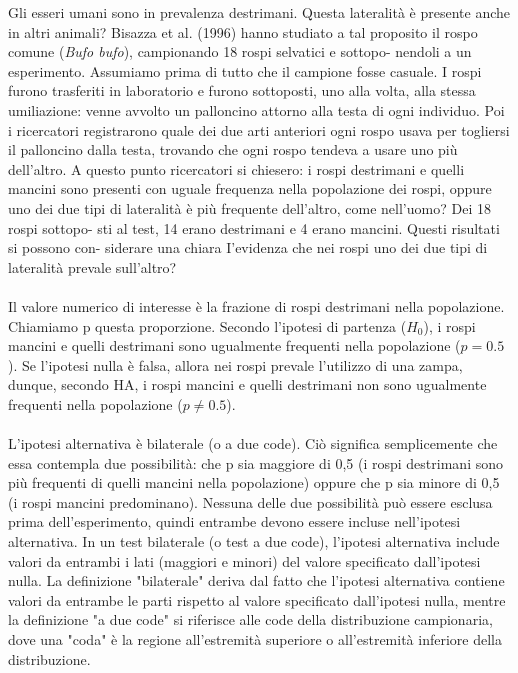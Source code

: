 \documentclass[drafts, 10pt]{book}
\newcounter{example}[section]
\begin{document}
\begin{example}\label{eslateralita}
    Gli esseri umani sono in prevalenza destrimani. Questa lateralità è presente anche in altri animali? Bisazza et al. (1996) hanno studiato a tal proposito il rospo comune (\textit{Bufo bufo}), campionando 18 rospi selvatici e sottopo- nendoli a un esperimento. Assumiamo prima di tutto che il campione fosse casuale. I rospi furono trasferiti in laboratorio e furono sottoposti, uno alla volta, alla stessa umiliazione: venne avvolto un palloncino attorno alla testa di ogni individuo. Poi i ricercatori registrarono quale dei due arti anteriori ogni rospo usava per togliersi il palloncino dalla testa, trovando che ogni rospo tendeva a usare uno più dell'altro. A questo punto ricercatori si chiesero: i rospi destrimani e quelli mancini sono presenti con uguale frequenza nella popolazione dei rospi, oppure uno dei due tipi di lateralità è più frequente dell'altro, come nell'uomo? Dei 18 rospi sottopo- sti al test, 14 erano destrimani e 4 erano mancini. Questi risultati si possono con- siderare una chiara I'evidenza che nei rospi uno dei due tipi di lateralità prevale sull'altro?
    \\
    \\
    Il valore numerico di interesse è la frazione di rospi destrimani nella popolazione. Chiamiamo p questa proporzione. Secondo l'ipotesi di partenza ($H_0$), i rospi mancini e quelli destrimani sono ugualmente frequenti nella popolazione ($p=0.5$). 
    Se l'ipotesi nulla è falsa, allora nei rospi prevale l'utilizzo di una zampa, dunque, secondo HA, i rospi mancini e quelli destrimani non sono ugualmente frequenti nella popolazione ($p \neq 0.5$).
    \\
    \\
    L'ipotesi alternativa è bilaterale (o a due code). Ciò significa semplicemente che essa contempla due possibilità: che p sia maggiore di 0,5 (i rospi destrimani sono più frequenti di quelli mancini nella popolazione) oppure che p sia minore di 0,5 (i rospi mancini predominano). Nessuna delle due possibilità può essere esclusa prima dell'esperimento, quindi entrambe devono essere incluse nell'ipotesi alternativa. In un test bilaterale (o test a due code), l'ipotesi alternativa include valori da entrambi i lati (maggiori e minori) del valore specificato dall'ipotesi nulla. La definizione "bilaterale" deriva dal fatto che l'ipotesi alternativa contiene valori da entrambe le parti rispetto al valore specificato dall'ipotesi nulla, mentre la definizione "a due code" si riferisce alle code della distribuzione campionaria, dove una "coda" è la regione all'estremità superiore o all'estremità inferiore della distribuzione. 
\end{example}
\end{document}
